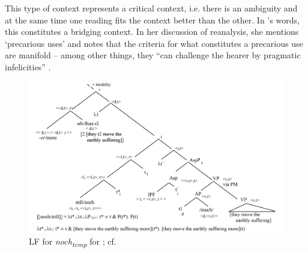 \documentclass[output=paper,
modfonts
]{langscibook}
\begin{document}
This type of context represents a critical context, i.e. there is an ambiguity and at the same time one reading fits the context better than the other. In \citeauthor{Eckardt_2011}'s \citeyearpar{Eckardt_2011} words, this constitutes a bridging context. In her discussion of reanalysis, she mentions `precarious uses' and notes that the criteria for what constitutes a precarious use are manifold -- among other things, they ``can challenge the hearer by pragmatic infelicities'' \citep[44]{Eckardt_2011}.

\begin{figure}
\includegraphics[width=1\textwidth]{figures/LF1_temp_>_over_noch}
\caption{LF for \textit{noch\textsubscript{temp}} for ; cf. \citep{beck2016a_sub}}
\label{fig:LF1_temp_>_over_noch}
\end{figure}
\end{document}
